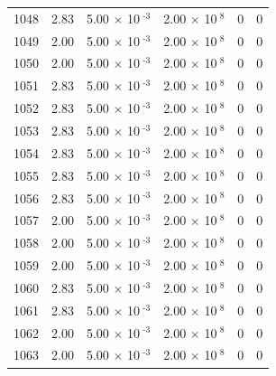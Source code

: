 \documentclass[a4paper,11pt]{article}
\begin{document}
\begin{center}
\begin{longtable}{|R{1.5cm}|R{2.4cm}|R{2.4cm}|R{2.4cm}|R{2.4cm}|R{2.4cm}|}
 1048 &   2.83  &         5.00 $\times$ 10$^{\text{          -3}}$  &         2.00 $\times$ 10$^{\text{           8}}$  & 0  & 0 \\
 1049 &   2.00  &         5.00 $\times$ 10$^{\text{          -3}}$  &         2.00 $\times$ 10$^{\text{           8}}$  & 0  & 0 \\
 1050 &   2.00  &         5.00 $\times$ 10$^{\text{          -3}}$  &         2.00 $\times$ 10$^{\text{           8}}$  & 0  & 0 \\
 1051 &   2.83  &         5.00 $\times$ 10$^{\text{          -3}}$  &         2.00 $\times$ 10$^{\text{           8}}$  & 0  & 0 \\
 1052 &   2.83  &         5.00 $\times$ 10$^{\text{          -3}}$  &         2.00 $\times$ 10$^{\text{           8}}$  & 0  & 0 \\
 1053 &   2.83  &         5.00 $\times$ 10$^{\text{          -3}}$  &         2.00 $\times$ 10$^{\text{           8}}$  & 0  & 0 \\
 1054 &   2.83  &         5.00 $\times$ 10$^{\text{          -3}}$  &         2.00 $\times$ 10$^{\text{           8}}$  & 0  & 0 \\
 1055 &   2.83  &         5.00 $\times$ 10$^{\text{          -3}}$  &         2.00 $\times$ 10$^{\text{           8}}$  & 0  & 0 \\
 1056 &   2.83  &         5.00 $\times$ 10$^{\text{          -3}}$  &         2.00 $\times$ 10$^{\text{           8}}$  & 0  & 0 \\
 1057 &   2.00  &         5.00 $\times$ 10$^{\text{          -3}}$  &         2.00 $\times$ 10$^{\text{           8}}$  & 0  & 0 \\
 1058 &   2.00  &         5.00 $\times$ 10$^{\text{          -3}}$  &         2.00 $\times$ 10$^{\text{           8}}$  & 0  & 0 \\
 1059 &   2.00  &         5.00 $\times$ 10$^{\text{          -3}}$  &         2.00 $\times$ 10$^{\text{           8}}$  & 0  & 0 \\
 1060 &   2.83  &         5.00 $\times$ 10$^{\text{          -3}}$  &         2.00 $\times$ 10$^{\text{           8}}$  & 0  & 0 \\
 1061 &   2.83  &         5.00 $\times$ 10$^{\text{          -3}}$  &         2.00 $\times$ 10$^{\text{           8}}$  & 0  & 0 \\
 1062 &   2.00  &         5.00 $\times$ 10$^{\text{          -3}}$  &         2.00 $\times$ 10$^{\text{           8}}$  & 0  & 0 \\
 1063 &   2.00  &         5.00 $\times$ 10$^{\text{          -3}}$  &         2.00 $\times$ 10$^{\text{           8}}$  & 0  & 0 \\

\end{longtable}
\end{center}
\end{document}
